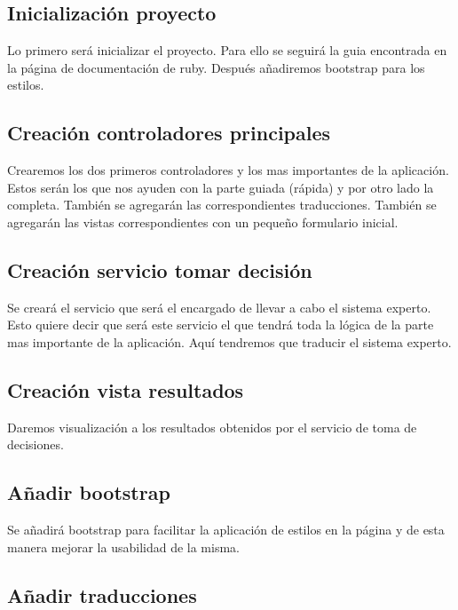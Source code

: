 
\subsection{Inicialización proyecto}

Lo primero será inicializar el proyecto. Para ello se seguirá la guia encontrada
en la página de documentación de ruby. Después añadiremos bootstrap para los estilos.

\subsection{Creación controladores principales}

Crearemos los dos primeros controladores y los mas importantes de la aplicación.
Estos serán los que nos ayuden con la parte guiada (rápida) y por otro lado la
completa. También se agregarán las correspondientes traducciones. También se
agregarán las vistas correspondientes con un pequeño formulario inicial.

\subsection{Creación servicio tomar decisión}

Se creará el servicio que será el encargado de llevar a cabo el sistema experto.
Esto quiere decir que será este servicio el que tendrá toda la lógica de la parte
mas importante de la aplicación. Aquí tendremos que traducir el sistema experto.

\subsection{Creación vista resultados}

Daremos visualización a los resultados obtenidos por el servicio de toma de decisiones.

\subsection{Añadir bootstrap}

Se añadirá bootstrap para facilitar la aplicación de estilos en la página y de esta
manera mejorar la usabilidad de la misma.

\subsection{Añadir traducciones}

